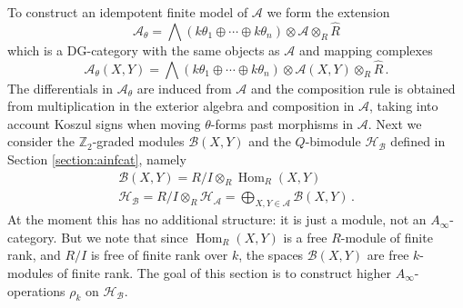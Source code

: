 \documentclass[english,letter paper,12pt,leqno]{article}
\theoremstyle{example}
\numberwithin{equation}{section}
\def\AA{\mathcal{A}}
\def\BB{\mathcal{B}}
\def\HH{\HH}
\def\HH{\mathcal{H}}
\def\Hom{\operatorname{Hom}}
\def\be{\begin{equation}}
\def\ee{\end{equation}}
\def\nZ{\mathds{Z}}
\begin{document}
To construct an idempotent finite model of $\AA$ we form the extension
\be\label{eq:defn_AAtheta}
\AA_{\theta} = \bigwedge( k \theta_1 \oplus \cdots \oplus k \theta_n ) \otimes \AA \otimes_R \widehat{R}
\ee
which is a DG-category with the same objects as $\AA$ and mapping complexes
\[
\AA_{\theta}( X, Y ) = \bigwedge( k \theta_1 \oplus \cdots \oplus k \theta_n ) \otimes \AA(X,Y) \otimes_R \widehat{R}\,.
\]
The differentials in $\AA_{\theta}$ are induced from $\AA$ and the composition rule is obtained from multiplication in the exterior algebra and composition in $\AA$, taking into account Koszul signs when moving $\theta$-forms past morphisms in $\AA$. Next we consider the $\nZ_2$-graded modules $\BB(X,Y)$ and the $Q$-bimodule $\HH_{\BB}$ defined in Section \ref{section:ainfcat}, namely
\begin{gather*}
\BB(X,Y) = R/I \otimes_R \Hom_R(X,Y)\\
\HH_{\BB} = R/I \otimes_R \HH_{\AA} = \bigoplus_{X,Y \in \AA} \BB(X,Y)\,.
\end{gather*}
At the moment this has no additional structure: it is just a module, not an $A_\infty$-category. But we note that since $\Hom_R(X,Y)$ is a free $R$-module of finite rank, and $R/I$ is free of finite rank over $k$, the spaces $\BB(X,Y)$ are free $k$-modules of finite rank. The goal of this section is to construct higher $A_\infty$-operations $\rho_k$ on $\HH_{\BB}$. %
\end{document}
